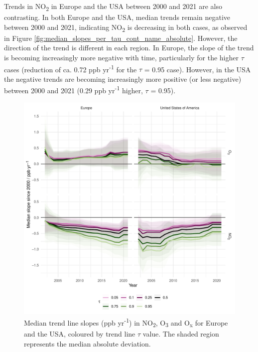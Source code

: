 \documentclass[journal abbreviation, manuscript]{copernicus}
\begin{document}
Trends in NO\textsubscript{2} in Europe and the USA between 2000 and 2021 are also contrasting. In both Europe and the USA, median trends remain negative between 2000 and 2021, indicating NO\textsubscript{2} is decreasing in both cases, as observed in Figure \ref{fig:median_slopes_per_tau_cont_name_absolute}. However, the direction of the trend is different in each region. In Europe, the slope of the trend is becoming increasingly more negative with time, particularly for the higher $\tau$ cases (reduction of ca. 0.72 ppb yr\textsuperscript{-1} for the $\tau$ = 0.95 case). However, in the USA the negative trends are becoming increasingly more positive (or less negative) between 2000 and 2021 (0.29 ppb yr\textsuperscript{-1} higher, $\tau$ = 0.95). 


\begin{figure}[t]
\includegraphics[width=12cm]{figures/f8_slopes.pdf}
\caption{Median trend line slopes (ppb yr\textsuperscript{-1}) in NO\textsubscript{2}, O\textsubscript{3} and O\textsubscript{x} for Europe and the USA, coloured by trend line $\tau$ value. The shaded region represents the median absolute deviation.}
\label{fig:median_slopes_per_tau_cont_name_trends}
\end{figure}
\end{document}
